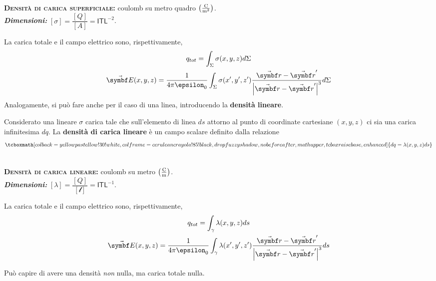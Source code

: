 \begin{units}~\\
	\textbf{\textsc{Densità di carica superficiale:}} coulomb su metro quadro $\left(\unit[per-mode = fraction]{\coulomb\per\square\meter}\right)$.\\
	\textit{\textbf{Dimensioni:}} $[\sigma]=\dfrac{[Q]}{[A]}=\mathsf{I}\mathsf{T}\mathsf{L}^{-2}$.
\end{units}
La carica totale e il campo elettrico sono, rispettivamente,
\begin{gather}
		q_{tot}=\int_\Sigma\sigma(x,y,z)d\Sigma\\
		\vba{E}(x,y,z)=\frac{1}{4\pi\epsilon_0}\int_\Sigma\sigma(x',y',z')\frac{\vba{r}-\vba{r}'}{\abs{\vba{r}-\vba{r}'}^3}d\Sigma
\end{gather}
Analogamente, si può fare anche per il caso di una linea, introducendo la \textbf{densità lineare}.
\begin{define}
	Considerato una lineare $\sigma$ carica tale che sull'elemento di linea $ds$ attorno al punto di coordinate cartesiane $(x,y,z)$ ci sia una carica infinitesima $dq$. La \textbf{densità di carica lineare} è un campo scalare definito dalla relazione
	\begin{equation}
		\tcboxmath[colback=yellowpastellow!30!white,colframe=ceruleancrayola!85!black,drop fuzzy shadow, nobeforeafter, math upper, tcbox raise base, enhanced]{dq=\lambda(x,y,z)ds}
	\end{equation}
\end{define}

\begin{units}~\\
	\textbf{\textsc{Densità di carica lineare:}} coulomb su metro $\left(\unit[per-mode = fraction]{\coulomb\per\meter}\right)$.\\
	\textit{\textbf{Dimensioni:}} $[\lambda]=\dfrac{[Q]}{[\mathcal{l}]}=\mathsf{I}\mathsf{T}\mathsf{L}^{-1}$.
\end{units}
La carica totale e il campo elettrico sono, rispettivamente,
\begin{gather}
	q_{tot}=\int_{\gamma}\lambda(x,y,z)ds\\
	\vba{E}(x,y,z)=\frac{1}{4\pi\epsilon_0}\int_{\gamma}\lambda(x',y',z')\frac{\vba{r}-\vba{r}'}{\abs{\vba{r}-\vba{r}'}^3}ds
\end{gather}
\begin{observe}
	Può capire di avere una densità \textit{non} nulla, ma carica totale nulla.
\end{observe}

